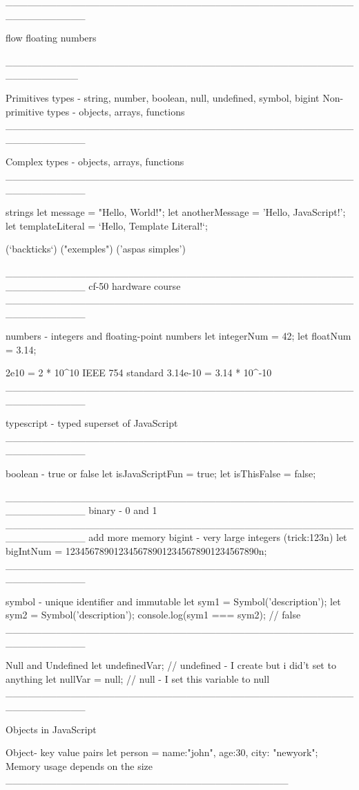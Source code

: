 {___________________________________________________________

flow 
floating numbers

__________________________________________________________

Primitives types - string, number, boolean, null, undefined, symbol, bigint
Non-primitive types - objects, arrays, functions
___________________________________________________________

Complex types - objects, arrays, functions
___________________________________________________________

strings
let message = "Hello, World!";
let anotherMessage = 'Hello, JavaScript!';
let templateLiteral = `Hello, Template Literal!`;

(`backticks`) ("exemples") ('aspas simples')

___________________________________________________________
cf-50 hardware course
___________________________________________________________ 

numbers - integers and floating-point numbers
let integerNum = 42;
let floatNum = 3.14;

2e10 = 2 * 10^10
IEEE 754 standard
3.14e-10 = 3.14 * 10^-10
___________________________________________________________   

typescript - typed superset of JavaScript 
___________________________________________________________

boolean - true or false
let isJavaScriptFun = true;
let isThisFalse = false;

___________________________________________________________
binary - 0 and 1   
___________________________________________________________
add more memory
bigint - very large integers (trick:123n)
let bigIntNum = 1234567890123456789012345678901234567890n;
___________________________________________________________

symbol - unique identifier and immutable
let sym1 = Symbol('description');
let sym2 = Symbol('description');
console.log(sym1 === sym2); // false
___________________________________________________________

Null and Undefined
let undefinedVar; // undefined - I create but i did't set to anything 
let nullVar = null; // null - I set this variable to null
___________________________________________________________ 

Objects in JavaScript

Object- key value pairs 
let person ={ name:"john", age:30, city: "newyork"};
Memory usage depends on the size
_______________________________________

}
